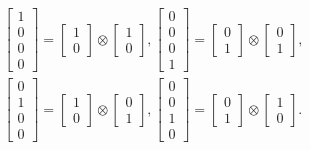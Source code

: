 \begin{equation}\label{eq:prodtens1}
	\begin{split}
&\begin{bmatrix}
1 \\
0 \\
0 \\
0
\end{bmatrix} = \begin{bmatrix}
1 \\
0
\end{bmatrix} \otimes \begin{bmatrix}
1 \\
0
\end{bmatrix},
\begin{bmatrix}
0 \\
0 \\
0 \\
1
\end{bmatrix} = \begin{bmatrix}
0 \\
1
\end{bmatrix} \otimes \begin{bmatrix}
0 \\
1
\end{bmatrix}, \\
&\begin{bmatrix}
0 \\
1 \\
0 \\
0
\end{bmatrix} = \begin{bmatrix}
1 \\
0
\end{bmatrix} \otimes \begin{bmatrix}
0 \\
1
\end{bmatrix},
\begin{bmatrix}
0 \\
0 \\
1 \\
0
\end{bmatrix} = \begin{bmatrix}
0 \\
1
\end{bmatrix} \otimes \begin{bmatrix}
1 \\
0
\end{bmatrix}.
	\end{split}
\end{equation}

